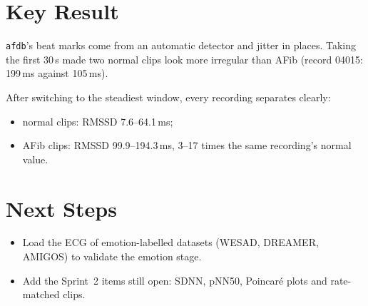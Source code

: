 \documentclass[11pt,a4paper]{article}
\begin{document}
\section{Key Result}
\texttt{afdb}'s beat marks come from an automatic detector and jitter in places. Taking the first
30\,s made two normal clips look more irregular than AFib (record 04015: 199\,ms against 105\,ms).

After switching to the steadiest window, every recording separates clearly:
\begin{itemize}
  \item normal clips: RMSSD 7.6--64.1\,ms;
  \item AFib clips: RMSSD 99.9--194.3\,ms, 3--17 times the same recording's normal value.
\end{itemize}

\section{Next Steps}
\begin{itemize}
  \item Load the ECG of emotion-labelled datasets (WESAD, DREAMER, AMIGOS) to validate the
    emotion stage.
  \item Add the Sprint~2 items still open: SDNN, pNN50, Poincar\'e plots and rate-matched clips.
\end{itemize}
\end{document}

